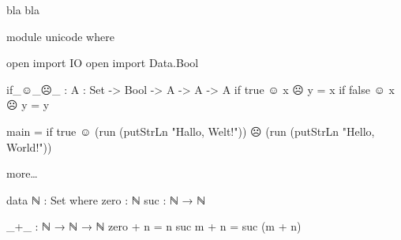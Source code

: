 bla bla
\begin{code}
module unicode where

open import IO
open import Data.Bool

if_☺_☹_ : {A : Set} -> Bool -> A -> A -> A
if true ☺ x ☹ y = x
if false ☺ x ☹ y = y

main = if true ☺ (run (putStrLn "Hallo, Welt!")) ☹ (run (putStrLn "Hello, World!"))

\end{code}

more…
\begin{code}
data ℕ : Set where
  zero  : ℕ
  suc   : ℕ → ℕ

_+_ : ℕ → ℕ → ℕ
zero   + n = n
suc m  + n = suc (m + n)
\end{code}
